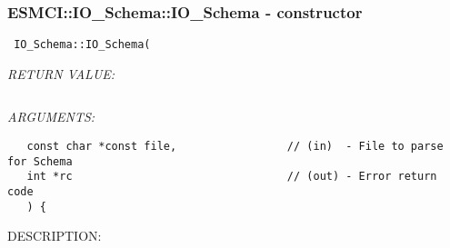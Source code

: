  
\setlength{\oldparskip}{\parskip}
\setlength{\parskip}{1.5ex}
\setlength{\oldparindent}{\parindent}
\setlength{\parindent}{0pt}
\setlength{\oldbaselineskip}{\baselineskip}
\setlength{\baselineskip}{11pt}
 
\def\bv{\begin{verbatim}}
\def\ev{\end{verbatim}}
\def\be{\begin{equation}}
\def\ee{\end{equation}}
\def\bea{\begin{eqnarray}}
\def\eea{\end{eqnarray}}
\def\bi{\begin{itemize}}
\def\ei{\end{itemize}}
\def\bn{\begin{enumerate}}
\def\en{\end{enumerate}}
\def\bd{\begin{description}}
\def\ed{\end{description}}
\def\({\left (}
\def\){\right )}
\def\[{\left [}
\def\]{\right ]}
\def\<{\left  \langle}
\def\>{\right \rangle}
\def\cI{{\cal I}}
\def\diag{\mathop{\rm diag}}
\def\tr{\mathop{\rm tr}}


 
\subsubsection [ESMCI::IO\_Schema::IO\_Schema] {ESMCI::IO\_Schema::IO\_Schema - constructor}


  
\begin{verbatim} IO_Schema::IO_Schema(\end{verbatim}{\em RETURN VALUE:}
\begin{verbatim}      \end{verbatim}{\em ARGUMENTS:}
\begin{verbatim}   const char *const file,                 // (in)  - File to parse for Schema
   int *rc                                 // (out) - Error return code
   ) {\end{verbatim}
{\sf DESCRIPTION:\\ }


